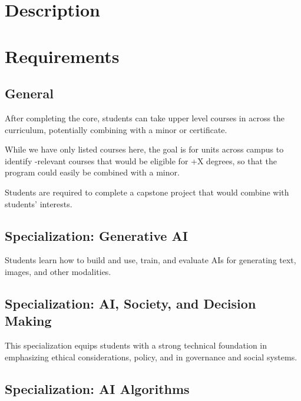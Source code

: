 \documentclass[
10pt, %
a4paper, %
oneside, %
headinclude,footinclude, %
BCOR5mm, %
]{scrartcl}
\begin{document}
\section{Description}



\section{Requirements}



\subsection{General}

After completing the core, students can take upper level courses in \ai{} across the curriculum, potentially combining with a minor or certificate.



While we have only listed  courses here, the goal is for units across campus to identify \ai{}-relevant courses that would be eligible for \ai{}+X degrees, so that the \ai{} program could easily be combined with a minor.

Students are required to complete a capstone project that would combine \ai{} with students' interests.

\subsection{Specialization: Generative AI}

    Students learn how to build and use, train, and evaluate AIs for generating text, images, and other modalities.


  

\subsection{Specialization: AI, Society, and Decision Making}

This specialization equips students with a strong technical foundation in \ai{} emphasizing ethical considerations, policy, and \ai{} in governance and social systems.



\subsection{Specialization: AI Algorithms}
\end{document}
